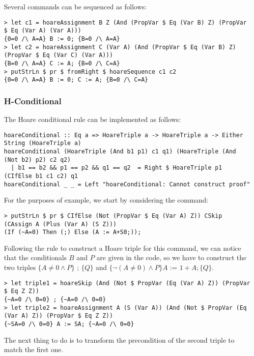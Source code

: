 \documentclass{article}
\begin{document}
Several commands can be sequenced as follows:

\begin{lstlisting}
> let c1 = hoareAssignment B Z (And (PropVar $ Eq (Var B) Z) (PropVar $ Eq (Var A) (Var A)))
{0=0 /\ A=A} B := 0; {B=0 /\ A=A}
> let c2 = hoareAssignment C (Var A) (And (PropVar $ Eq (Var B) Z) (PropVar $ Eq (Var C) (Var A)))
{B=0 /\ A=A} C := A; {B=0 /\ C=A}
> putStrLn $ pr $ fromRight $ hoareSequence c1 c2
{0=0 /\ A=A} B := 0; C := A; {B=0 /\ C=A}
\end{lstlisting}

\subsubsection{H-Conditional}

The Hoare conditional rule can be implemented as follows:

\begin{lstlisting}
hoareConditional :: Eq a => HoareTriple a -> HoareTriple a -> Either String (HoareTriple a)
hoareConditional (HoareTriple (And b1 p1) c1 q1) (HoareTriple (And (Not b2) p2) c2 q2)
  | b1 == b2 && p1 == p2 && q1 == q2  = Right $ HoareTriple p1 (CIfElse b1 c1 c2) q1
hoareConditional _ _ = Left "hoareConditional: Cannot construct proof"
\end{lstlisting}

For the purposes of example, we start by considering the command:

\begin{lstlisting}
> putStrLn $ pr $ CIfElse (Not (PropVar $ Eq (Var A) Z)) CSkip (CAssign A (Plus (Var A) (S Z)))
(If (~A=0) Then (;) Else (A := A+S0;));
\end{lstlisting}

Following the rule to construct a Hoare triple for this command, we can notice that the conditionals $B$ and $P$ are given in the code, so we have to construct the two triples $\{A \neq 0 \land P\} \texttt{ ; } \{Q\}$ and $\{\neg(A \neq 0) \land P\} A \texttt{ := } 1 + A; \{Q\}$.

\begin{lstlisting}
> let triple1 = hoareSkip (And (Not $ PropVar (Eq (Var A) Z)) (PropVar $ Eq Z Z))
{~A=0 /\ 0=0} ; {~A=0 /\ 0=0}
> let triple2 = hoareAssignment A (S (Var A)) (And (Not $ PropVar (Eq (Var A) Z)) (PropVar $ Eq Z Z))
{~SA=0 /\ 0=0} A := SA; {~A=0 /\ 0=0}
\end{lstlisting}

The next thing to do is to transform the precondition of the second triple to match the first one.
\end{document}
